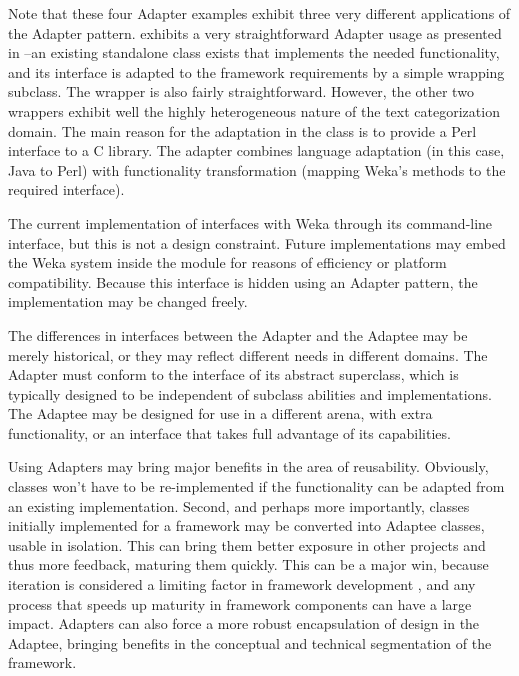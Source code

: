 Note that these four Adapter examples exhibit three very different
applications of the Adapter pattern.  
exhibits a very straightforward Adapter usage as presented in
\cite{gamma:95}--an existing standalone class exists that implements the
needed functionality, and its interface is adapted to the framework
requirements by a simple wrapping subclass.  The 
wrapper is also fairly straightforward.  However, the other two
wrappers exhibit well the highly heterogeneous nature of the text
categorization domain.  The main reason for the adaptation in the
 class is to provide a Perl interface to a C
library.  The  adapter combines language
adaptation (in this case, Java to Perl) with functionality
transformation (mapping Weka's methods to the required 
interface).

The current implementation of  interfaces with
Weka through its command-line interface, but this is not a design
constraint.  Future implementations may embed the Weka system inside
the  module for reasons of efficiency or platform
compatibility.  Because this interface is hidden using an Adapter
pattern, the implementation may be changed freely.

The differences in interfaces between the Adapter and the Adaptee may
be merely historical, or they may reflect different needs in different
domains.  The Adapter must conform to the interface of its abstract
superclass, which is typically designed to be independent of subclass
abilities and implementations.  The Adaptee may be designed for use in
a different arena, with extra functionality, or an interface that
takes full advantage of its capabilities.

Using Adapters may bring major benefits in the area of reusability.
Obviously, classes won't have to be re-implemented if the
functionality can be adapted from an existing implementation.  Second,
and perhaps more importantly, classes initially implemented for a
framework may be converted into Adaptee classes, usable in isolation.
This can bring them better exposure in other projects and thus more
feedback, maturing them quickly.  This can be a major win, because
iteration is considered a limiting factor in framework development
\cite[p. 75]{fayad:99}, and any process that speeds up maturity in
framework components can have a large impact.  Adapters can also force
a more robust encapsulation of design in the Adaptee, bringing
benefits in the conceptual and technical segmentation of the
framework.

